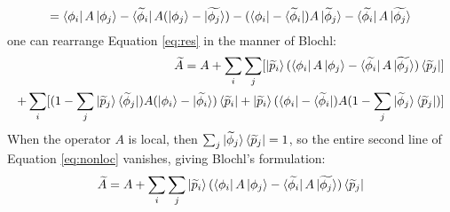 \documentclass[12pt]{article}
\begin{document}
$$=\bra{\phi_i}A\ket{\phi_j}-\bra{\widetilde{\phi}_i}A(\ket{\phi_j}-\ket{\widetilde{\phi_j}})
-(\bra{\phi_i}-\bra{\widetilde{\phi}_i})A\ket{\widetilde{\phi}_j}
-\bra{\widetilde{\phi_i}}A\ket{\widetilde{\phi_j}}$$
one can rearrange Equation \ref{eq:res} in the manner of Blochl\cite{blochl}:
\begin{equation}
\begin{split}
\widetilde{A}=A+\sum_i\sum_j[\ket{\widetilde{p}_i}(\bra{\phi_i}A\ket{\phi_j}
-\bra{\widetilde{\phi_i}}A\ket{\widetilde{\phi_j}})\bra{\widetilde{p}_j}] \\
+\sum_i[(1-\sum_j\ket{\widetilde{p}_j}\bra{\widetilde{\phi}_j})A(\ket{\phi_i}-\ket{\widetilde{\phi_i}})
\bra{\widetilde{p}_i}+\ket{\widetilde{p}_i}
(\bra{\phi_i}-\bra{\widetilde{\phi}_i})A(1-\sum_j\ket{\widetilde{\phi}_j}\bra{\widetilde{p}_j})]
\end{split}
\label{eq:nonloc}
\end{equation}
When the operator $A$ is local, then $\sum_j\ket{\widetilde{\phi}_j}\bra{\widetilde{p}_j}=1$,
so the entire second line of Equation \ref{eq:nonloc} vanishes, giving Blochl's formulation:\cite{blochl}
\begin{equation}
\widetilde{A}=A+\sum_i\sum_j\ket{\widetilde{p}_i}(\bra{\phi_i}A\ket{\phi_j}
-\bra{\widetilde{\phi_i}}A\ket{\widetilde{\phi_j}})\bra{\widetilde{p}_j}
\label{eq:loc}
\end{equation}
\end{document}
